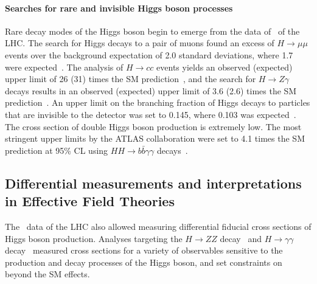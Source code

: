 \paragraph{Searches for rare and invisible Higgs boson processes}
Rare decay modes of the Higgs boson begin to emerge from the data of \RunTwo\ of the LHC. 
The search for Higgs decays to a pair of muons found an excess of $H \to \mu\mu$ events over the background expectation of 2.0 standard deviations, where 1.7 were expected~\cite{HIGG-2019-14}.
The analysis of $H \to cc$ events yields an observed (expected) upper limit of 26 (31) times the SM prediction~\cite{ATLAS-CONF-2021-021}, and the search for $H \to Z\gamma$ decays results in an observed (expected) upper limit of 3.6 (2.6) times the SM prediction~\cite{HIGG-2018-42}.
An upper limit on the branching fraction of Higgs decays to particles that are invisible to the detector was set to 0.145, where 0.103 was expected~\cite{ATLASInvisible1}.
The cross section of double Higgs boson production is extremely low. The most stringent upper limits by the ATLAS collaboration were set to 4.1 times the SM prediction at 95\% CL using $HH \to b\bar{b}\gamma\gamma$ decays~\cite{ATLAS-CONF-2021-016}.

\subsection{Differential measurements and interpretations in Effective Field Theories}
The \RunTwo\ data of the LHC also allowed measuring differential fiducial cross sections of Higgs boson production. Analyses targeting the $H \to ZZ$ decay~\cite{ATLAS:2020wny} and $H \to \gamma\gamma$ decay~\cite{hgammagammaDiff} measured cross sections for a variety of observables sensitive to the production and decay processes of the Higgs boson, and set constraints on beyond the SM effects.

